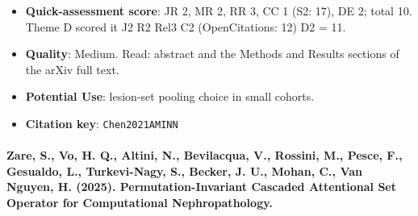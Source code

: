 \documentclass[journal,onecolumn]{IEEEtran}
\begin{document}
\begin{itemize}
\item{} \textbf{Quick-assessment score}: JR 2, MR 2, RR 3, CC 1 (S2: 17), DE 2; total 10. Theme D scored it J2 R2 Rel3 C2 (OpenCitations: 12) D2 = 11.

\item{} \textbf{Quality}: Medium. Read: abstract and the Methods and Results sections of the arXiv full text.

\item{} \textbf{Potential Use}: lesion-set pooling choice in small cohorts.

\item{} \textbf{Citation key}: \texttt{Chen2021AMINN}

\end{itemize}

\paragraph{Zare, S., Vo, H. Q., Altini, N., Bevilacqua, V., Rossini, M., Pesce, F., Gesualdo, L., Turkevi-Nagy, S., Becker, J. U., Mohan, C., Van Nguyen, H. (2025). Permutation-Invariant Cascaded Attentional Set Operator for Computational Nephropathology.~\cite{Zare2025PICASO}}\mbox{}
\end{document}
